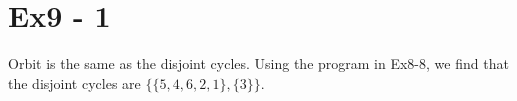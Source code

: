 \section*{Ex9 - 1}
Orbit is the same as the disjoint cycles. Using the program in Ex8-8, we find that the disjoint cycles are $ \{\{5, 4, 6, 2, 1\}, \{3\}\} $.